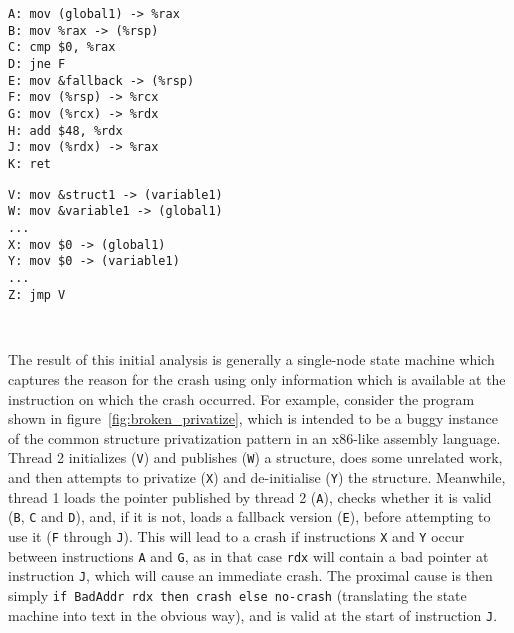 \documentclass[10pt,twocolumn,preprint,natbib,authoryear]{sigplanconf}
\makeatletter
\newcommand{\editorial}[1]{}
\newcommand{\needCite}{\editorial{need cite}}
\newenvironment{subfloat}%
    {\def\caption##1{\gdef\subcapsave{\relax##1}}%
     \let\subcapsave=\@empty %
     \let\sf@oldlabel=\label
     \def\label##1{\xdef\sublabsave{\noexpand\label{##1}}}%
     \let\sublabsave\relax    %
     \setbox\subfigbox\hbox
       \bgroup}%
      {\egroup                %
     \let\label=\sf@oldlabel
     \subfigure[\subcapsave]{\box\subfigbox}}%
\makeatother
\begin{document}
\begin{figure*}
 \begin{subfloat}
  \begin{minipage}{90mm}
\begin{verbatim}
A: mov (global1) -> %rax
B: mov %rax -> (%rsp)
C: cmp $0, %rax
D: jne F
E: mov &fallback -> (%rsp)
F: mov (%rsp) -> %rcx
G: mov (%rcx) -> %rdx
H: add $48, %rdx
J: mov (%rdx) -> %rax
K: ret
\end{verbatim}
  \end{minipage}
  \caption{Thread 1}
 \end{subfloat}
 \begin{subfloat}
  \begin{minipage}{90mm}
\begin{verbatim}
V: mov &struct1 -> (variable1)
W: mov &variable1 -> (global1)
...
X: mov $0 -> (global1)
Y: mov $0 -> (variable1)
...
Z: jmp V



\end{verbatim}
  \end{minipage}
  \caption{Thread 2}
 \end{subfloat}
 \caption{A buggy example of the privatize synchronization pattern.}
 \label{fig:broken_privatize}
\end{figure*}

The result of this initial analysis is generally a single-node state
machine which captures the reason for the crash using only information
which is available at the instruction on which the crash occurred.
For example, consider the program shown in figure~\ref{fig:broken_privatize},
which is intended to be a buggy instance
of the common structure privatization pattern\needCite{} in an
x86-like assembly language.  Thread 2 initializes (\verb|V|) and
publishes (\verb|W|) a structure, does some unrelated work, and then
attempts to privatize (\verb|X|) and de-initialise (\verb|Y|) the
structure.  Meanwhile, thread 1 loads the pointer published by thread
2 (\verb|A|), checks whether it is valid (\verb|B|, \verb|C| and
\verb|D|), and, if it is not, loads a fallback version (\verb|E|),
before attempting to use it (\verb|F| through \verb|J|).  This will
lead to a crash if instructions \verb|X| and \verb|Y| occur between
instructions \verb|A| and \verb|G|, as in that case \verb|rdx| will
contain a bad pointer at instruction \verb|J|, which will cause an
immediate crash.  The proximal cause is then simply
\verb|if BadAddr rdx then crash else no-crash| (translating the state
machine into text in the obvious way), and is valid at the start of
instruction \verb|J|.
\end{document}
